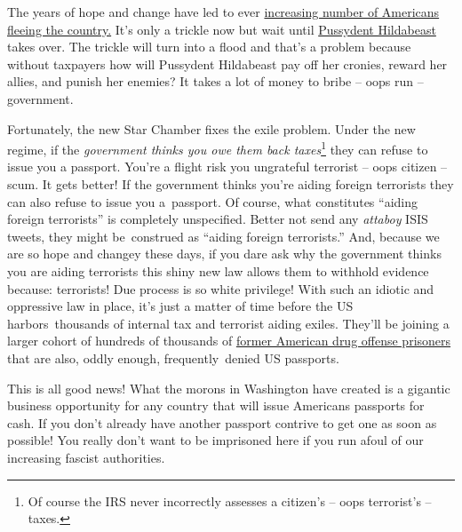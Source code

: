 The years of hope and change have led to ever
\href{http://www.forbes.com/sites/robertwood/2015/02/11/thousands-renounce-u-s-citizenship-hitting-new-record-not-just-over-taxes/}{increasing
number of Americans fleeing the country.} It's only a trickle now but
wait until
\href{https://bakerjd99.wordpress.com/2014/04/15/pussydent-hildabeast/}{Pussydent
Hildabeast} takes over. The trickle will turn into a flood and that's a
problem because without taxpayers how will Pussydent Hildabeast pay off
her cronies, reward her allies, and punish her enemies? It takes a lot
of money to bribe -- oops run -- government.

Fortunately, the new Star Chamber fixes the exile problem. Under the new
regime, if the \emph{government thinks you owe them back
taxes}\footnote{Of course the IRS never incorrectly assesses a citizen's -- oops
terrorist's -- taxes.} they can refuse to issue you a
passport. You're a flight risk you ungrateful terrorist -- oops citizen
-- scum. It gets better! If the government thinks you're aiding foreign
terrorists they can also refuse to issue you a~passport. Of course, what
constitutes ``aiding foreign terrorists'' is completely unspecified.
Better not send any \emph{attaboy} ISIS tweets, they might be~construed
as ``aiding foreign terrorists.'' And, because we are so hope and
changey these days, if you dare ask why the government thinks you are
aiding terrorists this shiny new law allows them to withhold evidence
because: terrorists! Due process is so white privilege! With such an
idiotic and oppressive law in place, it's just a matter of time before
the US harbors~thousands of internal tax and terrorist aiding exiles.
They'll be joining a larger cohort of hundreds of thousands of
\href{http://criminal-law.freeadvice.com/criminal-law/criminal-law/obtaining-passport-criminal-record.htm}{former
American drug offense prisoners} that are also, oddly enough, 
frequently~denied US passports.

This is all good news! What the morons in Washington have created is a
gigantic business opportunity for any country that will issue Americans
passports for cash. If you don't already have another passport contrive
to get one as soon as possible! You really don't want to be imprisoned
here if you run afoul of our increasing fascist authorities.

%



%
